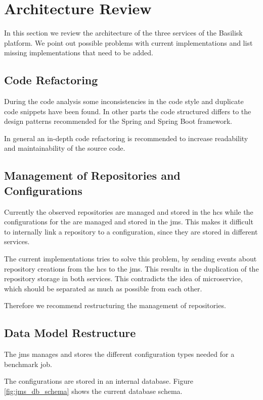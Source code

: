 \section{Architecture Review}
\label{sec:architecture_review}
In this section we review the architecture of the three services of the Basilisk platform.
We point out possible problems with current implementations and list missing implementations that need to be added.


\subsection{Code Refactoring}
\label{sec:code_refactor}
During the code analysis some inconsistencies in the code style and duplicate code snippets have been found.
In other parts the code structured differs to the design patterns recommended for the Spring and Spring Boot framework.

In general an in-depth code refactoring is recommended to increase readability and maintainability of the source code. 


\subsection{Management of Repositories and Configurations}
\label{sec:management_repo_config}
Currently the observed repositories are managed and stored in the \ac{hcs} while the configurations for the \tsp{} are managed and stored in the \ac{jms}.
This makes it difficult to internally link a repository to a \ts{} configuration, since they are stored in different services.

The current implementations tries to solve this problem, by sending events about repository creations from the \ac{hcs} to the \ac{jms}.
This results in the duplication of the repository storage in both services.
This contradicts the idea of microservice, which should be separated as much as possible from each other.

Therefore we recommend restructuring the management of repositories.



\subsection{Data Model Restructure}
\label{sec:review_data_model}
The \ac{jms} manages and stores the different configuration types needed for a benchmark job.

The configurations are stored in an internal database.
Figure \ref{fig:jms_db_schema} shows the current database schema.

